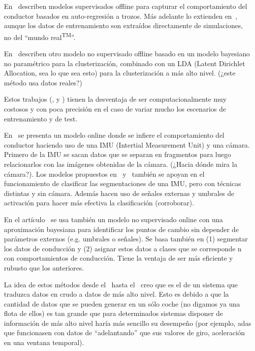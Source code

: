 En~\cite{sekizawa2007modeling} describen modelos supervisados offline para capturar el comportamiento del conductor basados en auto-regresión a trozos. Más adelante lo extienden en~\cite{terada2010multi}, aunque los datos de entrenamiento son extraídos directamente de simulaciones, no del \enquote{mundo real\textsuperscript{TM}}.

En~\cite{bando2013unsupervised} describen otro modelo no supervisado offline basado en un modelo bayesiano no paramétrico para la clusterización, combinado con un LDA (Latent Dirichlet Allocation, sea lo que sea esto) para la clusterización a más alto nivel. (\TODO ¿este método usa datos reales?)

Estos trabajos (\cite{sekizawa2007modeling}, \cite{terada2010multi} y \cite{bando2013unsupervised}) tienen la desventaja de ser computacionalmente muy costosos y con poca precisión en el caso de variar mucho los escenarios de entrenamiento y de test.

En~\cite{maye2011bayesian} se presenta un modelo online donde se infiere el comportamiento del conductor haciendo uso de una IMU (Intertial Measurement Unit) y una cámara. Primero de la IMU se sacan datos que se separan en fragmentos para luego relacionarlos con las imágenes obtenidas de la cámara. (\TODO ¿Hacia dónde mira la cámara?). Los modelos propuestos en~\cite{johnson2011driving} y~\cite{van2013driver} también se apoyan en el funcionamiento de clasificar las segmentaciones de una IMU, pero con técnicas distintas y sin cámara. Además hacen uso de señales externas y umbrales de activación para hacer más efectiva la clasificación (\TODO corroborar).

En el artículo~\cite{bender2015unsupervised} se usa también un modelo no supervisado online con una aproximación bayesiana para identificar los puntos de cambio sin depender de parámetros externos (e.g. umbrales o señales). Se basa también en (1) segmentar los datos de conducción y (2) asignar estos datos a clases que se corresponde n con comportamientos de conducción. Tiene la ventaja de ser más eficiente y rubusto que los anteriores.

La idea de estos métodos desde el~\cite{sekizawa2007modeling} hasta el~\cite{bender2015unsupervised} creo que es el de un sistema que traduzca datos en crudo a datos de más alto nivel. Esto es debido a que la cantidad de datos que se pueden generar en un sólo coche (no digamos ya una flota de ellos) es tan grande que para determinados sistemas disponer de información de más alto nivel haría más sencillo su desempeño (por ejemplo, \gls{adas} que funcionasen con datos de \enquote{adelantando} que sus valores de giro, aceleración en una ventana temporal).

